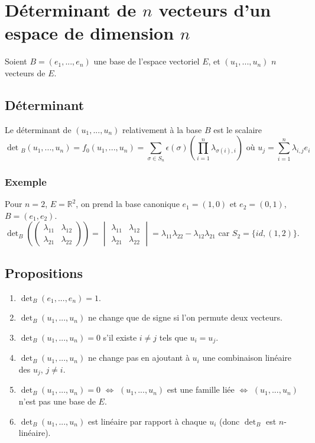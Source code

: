 \documentclass[a4paper,10pt]{book} %
\newcommand{\R}{\mathbb{R}}
\newcommand{\ev}{espace vectoriel }
\begin{document}
\newpage

\section{Déterminant de $n$ vecteurs d'un espace de dimension $n$}
Soient $B=(e_1,...,e_n)$ une base de l'\ev $E$, et $(u_1,...,u_n)$ $n$ vecteurs de $E$.

\subsection{Déterminant}
Le déterminant de $(u_1,...,u_n)$ relativement à la base $B$ est le scalaire $$\det{}_B(u_1,...,u_n)=f_0(u_1,...,u_n)=\sum_{\sigma\in S_n} \epsilon(\sigma)(\prod_{i=1}^n\lambda_{\sigma(i),i})\text{ où }u_j=\sum_{i=1}^n \lambda_{i,j}e_i$$

\subsubsection{Exemple}
Pour $n=2$, $E=\R^2$, on prend la base canonique $e_1=(1,0)$ et $e_2=(0,1)$, $B=(e_1,e_2)$.\\
$\det_B (\begin{pmatrix}
\lambda_{11} & \lambda_{12} \\
\lambda_{21} & \lambda_{22}
\end{pmatrix})=\begin{vmatrix}
\lambda_{11} & \lambda_{12} \\
\lambda_{21} & \lambda_{22}
\end{vmatrix}=\lambda_{11}\lambda_{22}-\lambda_{12}\lambda_{21}$ car $S_2=\{id, (1,2)\}$.

\subsection{Propositions}
\begin{enumerate}
\item $\det_B(e_1,...,e_n)=1$.
\item $\det_B(u_1,...,u_n)$ ne change que de signe si l'on permute deux vecteurs.
\item $\det_B(u_1,...,u_n)=0$ s'il existe $i\neq j$ tels que $u_i=u_j$.
\item $\det_B(u_1,...,u_n)$ ne change pas en ajoutant à $u_i$ une combinaison linéaire des $u_j$, $j\neq i$.
\item $\det_B(u_1,...,u_n)=0$ \hfill $\Leftrightarrow$ \hfill $(u_1,...,u_n)$ est une famille liée \hfill $\Leftrightarrow$ \hfill $(u_1,...,u_n)$ n'est pas une base de $E$.
\item $\det_B(u_1,...,u_n)$ est linéaire par rapport à chaque $u_i$ (donc $\det_B$ est $n$-linéaire).
\end{enumerate}
\end{document}
